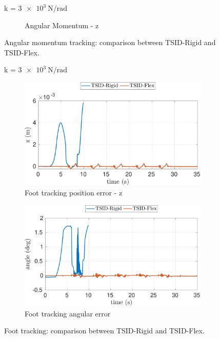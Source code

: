 \begin{figure}[p]
\begin{myframe}{k = $\SI{3e3}{\newton \per \radian}$}
\begin{subfigure}[b]{0.49\textwidth}
        \caption{Angular Momentum - z}
    \end{subfigure}
    \end{myframe}
    \caption{Angular momentum tracking: comparison between TSID-Rigid and TSID-Flex.\label{fig:angular_momentum_tracking_3000_rigid_flex}}
\end{figure}

\begin{figure}[p]
    \begin{myframe}{k = $\SI{3e3}{\newton \per \radian}$}
    \centering
        \begin{subfigure}[b]{0.49\textwidth}
        \centering
        \includegraphics[width=\columnwidth]{chapter_flexible_joints/figures/comparison_3000_left_foot_position_error_z.pdf}
        \caption{Foot tracking position error - z}
    \end{subfigure}
    \hfill
    \begin{subfigure}[b]{0.49\textwidth}
        \centering
        \includegraphics[width=\columnwidth]{chapter_flexible_joints/figures/comparison_3000_left_foot_angle_rot_error.pdf}
        \caption{Foot tracking angular error}
    \end{subfigure}
    \end{myframe}
    \caption{Foot tracking: comparison between TSID-Rigid and TSID-Flex.\label{fig:foot_error_3000_rigid_flex}}
\end{figure}


